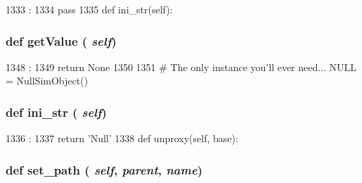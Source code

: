 \begin{DoxyCode}
1333                                                     :
1334         pass
1335 
    def ini_str(self):
\end{DoxyCode}
\hypertarget{classm5_1_1params_1_1NullSimObject_acc340fbd4335fa34f9d57fb454b28ed0}{
\subsubsection[{getValue}]{\setlength{\rightskip}{0pt plus 5cm}def getValue ( {\em self})}}
\label{classm5_1_1params_1_1NullSimObject_acc340fbd4335fa34f9d57fb454b28ed0}



\begin{DoxyCode}
1348                       :
1349         return None
1350 
1351 # The only instance you'll ever need...
NULL = NullSimObject()
\end{DoxyCode}
\hypertarget{classm5_1_1params_1_1NullSimObject_a33ebe6cd32bcbd15465fc28b9d94bf82}{
\subsubsection[{ini\_\-str}]{\setlength{\rightskip}{0pt plus 5cm}def ini\_\-str ( {\em self})}}
\label{classm5_1_1params_1_1NullSimObject_a33ebe6cd32bcbd15465fc28b9d94bf82}



\begin{DoxyCode}
1336                      :
1337         return 'Null'
1338 
    def unproxy(self, base):
\end{DoxyCode}
\hypertarget{classm5_1_1params_1_1NullSimObject_a2936eb8d5f8be9897b3f42bfed105e62}{
\subsubsection[{set\_\-path}]{\setlength{\rightskip}{0pt plus 5cm}def set\_\-path ( {\em self}, \/   {\em parent}, \/   {\em name})}}
\label{classm5_1_1params_1_1NullSimObject_a2936eb8d5f8be9897b3f42bfed105e62}



